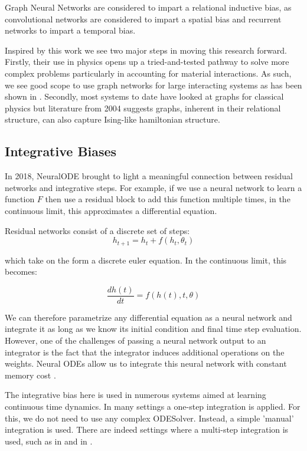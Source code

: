 \documentclass{article}
\begin{document}
Graph Neural Networks are considered to impart a relational inductive bias, as convolutional networks are considered to impart a spatial bias and recurrent networks to impart a temporal bias. 

Inspired by this work we see two major steps in moving this research forward. Firstly, their use in physics opens up a tried-and-tested pathway to solve more complex problems particularly in accounting for material interactions. As such, we see good scope to use graph networks for large interacting systems as has been shown in \cite{sanchez-gonzalez_learning_2020}. Secondly, most systems to date have looked at graphs for classical physics but literature from 2004 suggests graphs, inherent in their relational structure, can also capture Ising-like hamiltonian structure.

\subsection{Integrative Biases}

In 2018, NeuralODE brought to light a meaningful connection between residual networks and integrative steps. For example, if we use a neural network to learn a function $F$ then use a residual block to add this function multiple times, in the continuous limit, this approximates a differential equation.

Residual networks consist of a discrete set of steps:
$$ h_{t+1} = h_t + f(h_t,\theta_t) $$

which take on the form a discrete euler equation. In the continuous limit, this becomes:

$$ \frac{dh(t)}{dt} = f(h(t),t,\theta) $$

We can therefore parametrize any differential equation as a neural network and integrate it as long as we know its initial condition and final time step evaluation. However, one of the challenges of passing a neural network output to an integrator is the fact that the integrator induces additional operations on the weights. Neural ODEs allow us to integrate this neural network with constant memory cost \cite{chen_neural_2018}.

The integrative bias here is used in numerous systems aimed at learning continuous time dynamics. In many settings a one-step integration is applied. For this, we do not need to use any complex ODESolver. Instead, a simple 'manual' integration is used. There are indeed settings where a multi-step integration is used, such as in \cite{zhong_symplectic_2019} and in \cite{saemundsson_variational_2019}.
\end{document}
